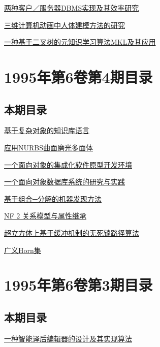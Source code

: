 \documentclass[a4paper]{article}
\begin{document}
\href{http://www.jos.org.cn/ch/reader/download_pdf.aspx?file_no=19950507&year_id=1995&quarter_id=5&falg=1}{两种客户／服务器DBMS实现及其效率研究}

\href{http://www.jos.org.cn/ch/reader/download_pdf.aspx?file_no=19950508&year_id=1995&quarter_id=5&falg=1}{三维计算机动画中人体建模方法的研究}

\href{http://www.jos.org.cn/ch/reader/download_pdf.aspx?file_no=19950509&year_id=1995&quarter_id=5&falg=1}{一种基于二叉树的元知识学习算法MKL及其应用}


\section{\textbf{1995年第6卷第4期目录}}
\subsection{本期目录}
\href{http://www.jos.org.cn/ch/reader/download_pdf.aspx?file_no=19950401&year_id=1995&quarter_id=4&falg=1}{基于复杂对象的知识库语言}

\href{http://www.jos.org.cn/ch/reader/download_pdf.aspx?file_no=19950402&year_id=1995&quarter_id=4&falg=1}{应用NURBS曲面磨光多面体}

\href{http://www.jos.org.cn/ch/reader/download_pdf.aspx?file_no=19950403&year_id=1995&quarter_id=4&falg=1}{一个面向对象的集成化软件原型开发环境}

\href{http://www.jos.org.cn/ch/reader/download_pdf.aspx?file_no=19950404&year_id=1995&quarter_id=4&falg=1}{一个面向对象数据库系统的研究与实践}

\href{http://www.jos.org.cn/ch/reader/download_pdf.aspx?file_no=19950405&year_id=1995&quarter_id=4&falg=1}{基于组合─分解的机器发现方法}

\href{http://www.jos.org.cn/ch/reader/download_pdf.aspx?file_no=19950406&year_id=1995&quarter_id=4&falg=1}{NF 2 关系模型与属性继承}

\href{http://www.jos.org.cn/ch/reader/download_pdf.aspx?file_no=19950407&year_id=1995&quarter_id=4&falg=1}{超立方体上基于缓冲机制的无死锁路径算法}

\href{http://www.jos.org.cn/ch/reader/download_pdf.aspx?file_no=19950408&year_id=1995&quarter_id=4&falg=1}{广义Horn集}


\section{\textbf{1995年第6卷第3期目录}}
\subsection{本期目录}
\href{http://www.jos.org.cn/ch/reader/download_pdf.aspx?file_no=19950301&year_id=1995&quarter_id=3&falg=1}{一种智能译后编辑器的设计及其实现算法}
\end{document}
